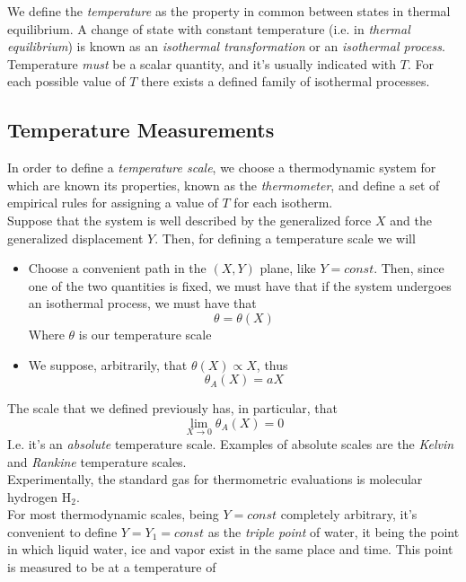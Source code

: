 \documentclass[../qm.tex]{subfiles}
\begin{document}
\begin{dfn}[Temperature]
	We define the \textit{temperature} as the property in common between states in thermal equilibrium. A change of state with constant temperature (i.e. in \textit{thermal equilibrium}) is known as an \textit{isothermal transformation} or an \textit{isothermal process}.\\
	Temperature \textit{must} be a scalar quantity, and it's usually indicated with $T$. For each possible value of $T$ there exists a defined family of isothermal processes.
\end{dfn}
\subsection{Temperature Measurements}
In order to define a \textit{temperature scale}, we choose a thermodynamic system for which are known its properties, known as the \textit{thermometer}, and define a set of empirical rules for assigning a value of $T$ for each isotherm.\\
Suppose that the system is well described by the generalized force $X$ and the generalized displacement $Y$. Then, for defining a temperature scale we will
\begin{itemize}
\item Choose a convenient path in the $(X, Y)$ plane, like $Y=const$. Then, since one of the two quantities is fixed, we must have that if the system undergoes an isothermal process, we must have that
	\begin{equation*}
		\theta=\theta(X)
	\end{equation*}
	Where $\theta$ is our temperature scale
\item We suppose, arbitrarily, that $\theta(X)\propto X$, thus
	\begin{equation*}
		\theta_A(X)=aX
	\end{equation*}
\end{itemize}
The scale that we defined previously has, in particular, that
\begin{equation*}
	\lim_{X\to0}\theta_A(X)=0
\end{equation*}
I.e. it's an \textit{absolute} temperature scale. Examples of absolute scales are the \textit{Kelvin} and \textit{Rankine} temperature scales.\\
Experimentally, the standard gas for thermometric evaluations is molecular hydrogen $\mathrm{H}_2$.\\
For most thermodynamic scales, being $Y=const$ completely arbitrary, it's convenient to define $Y=Y_1=const$ as the \textit{triple point} of water, it being the point in which liquid water, ice and vapor exist in the same place and time. This point is measured to be at a temperature of 
\end{document}
